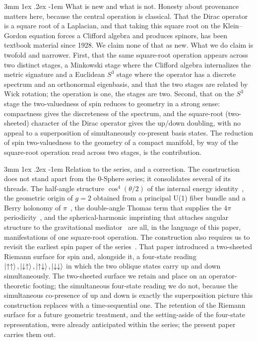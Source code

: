 \documentclass[%
 reprint, amsmath,amssymb, aps, prb, ]{revtex4-2}
\makeatletter
\numberwithin{equation}{section}
\renewcommand\paragraph{%
  \@startsection{paragraph}{4}{\z@}%
    {3mm \@plus 1ex \@minus .2ex}%
    {-1em}%
    {\normalfont\normalsize\itshape}}
\newcommand{\iphase}{\theta}  %
\makeatother
\begin{document}
\paragraph{What is new and what is not.}
Honesty about provenance matters here, because the central operation is classical. That the Dirac operator is a square root of a Laplacian, and that taking this square root on the Klein--Gordon equation forces a Clifford algebra and produces spinors, has been textbook material since 1928. We claim none of that as new. What we do claim is twofold and narrower. First, that the same square-root operation appears across two distinct stages, a Minkowski stage where the Clifford algebra internalizes the metric signature and a Euclidean $S^{3}$ stage where the operator has a discrete spectrum and an orthonormal eigenbasis, and that the two stages are related by Wick rotation; the operation is one, the stages are two. Second, that on the $S^{3}$ stage the two-valuedness of spin reduces to geometry in a strong sense: compactness gives the discreteness of the spectrum, and the square-root (two-sheeted) character of the Dirac operator gives the up/down doubling, with no appeal to a superposition of simultaneously co-present basis states. The reduction of spin two-valuedness to the geometry of a compact manifold, by way of the square-root operation read across two stages, is the contribution.

\paragraph{Relation to the series, and a correction.}
The construction does not stand apart from the 0-Sphere series; it consolidates several of its threads. The half-angle structure $\cos^{4}(\iphase/2)$ of the internal energy identity~\cite{hanamura01}, the geometric origin of $g=2$ obtained from a principal U(1) fiber bundle and a Berry holonomy of $\pi$~\cite{hanamura48}, the double-angle Thomas term that supplies the $4\pi$ periodicity~\cite{hanamura50}, and the spherical-harmonic imprinting that attaches angular structure to the gravitational mediator~\cite{hanamura57} are all, in the language of this paper, manifestations of one square-root operation. The construction also requires us to revisit the earliest spin paper of the series~\cite{hanamura03}. That paper introduced a two-sheeted Riemann surface for spin and, alongside it, a four-state reading $\ket{\uparrow\uparrow},\ket{\downarrow\uparrow},\ket{\uparrow\downarrow},\ket{\downarrow\downarrow}$ in which the two oblique states carry up and down simultaneously. The two-sheeted surface we retain and place on an operator-theoretic footing; the simultaneous four-state reading we do not, because the simultaneous co-presence of up and down is exactly the superposition picture this construction replaces with a time-sequential one. The retention of the Riemann surface for a future geometric treatment, and the setting-aside of the four-state representation, were already anticipated within the series; the present paper carries them out.
\end{document}
